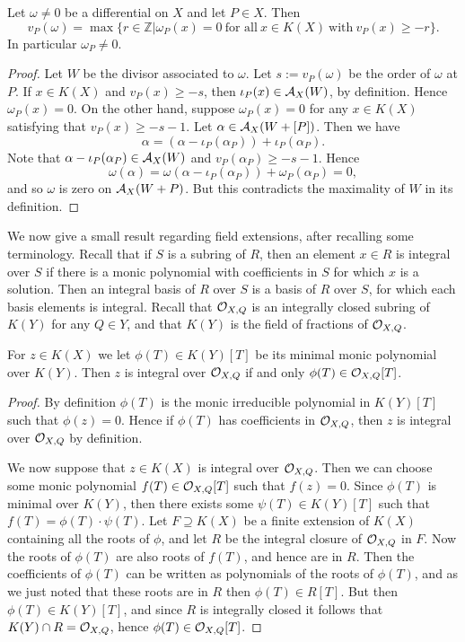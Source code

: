 \begin{prop}\label{propertyofomega}
 Let $\omega \neq 0$ be a differential on $X$ and let $P\in X$. Then
 \[
  v_P(\omega) = \max \{r\in \mathbb{Z}|\omega_P(x) = 0\ \text{for all} \ x\in K(X) \ \text{with}\ v_P(x) \geq -r\}.
 \]
In particular $\omega_P \neq 0$.
\end{prop}
\begin{proof}
 Let $W$ be the divisor associated to $\omega$.
 Let $s:=v_P(\omega)$ be the order of $\omega$ at $P$.
 If $x\in K(X)$ and $v_P(x)\geq -s$, then $\iota_P(x) \in {\mathcal A}_X(W)$, by definition.
 Hence $\omega_P(x) = 0$.
 On the other hand, suppose $\omega_P(x) = 0$ for any $x\in K(X)$ satisfying that $v_P(x) \geq -s-1$.
 Let $\alpha\in {\mathcal A}_X(W+[P])$.
 Then we have
 \[
  \alpha = (\alpha-\iota_P(\alpha_P)) + \iota_P(\alpha_P).
 \]
Note that $\alpha - \iota_P(\alpha_P)\in {\mathcal A}_X(W)$ and $v_P(\alpha_P) \geq -s-1$.
Hence
\[
 \omega(\alpha) = \omega(\alpha-\iota_P(\alpha_P))  + \omega_P(\alpha_P) = 0,
\]
and so $\omega$ is zero on ${\mathcal A}_X(W+P)$.
But this contradicts the maximality of $W$ in its definition.
 
\end{proof}



We now give a small result regarding field extensions, after recalling some terminology.
Recall that if $S$ is a subring of $R$, then an element $x\in R$ is integral over $S$ if there is a monic polynomial with coefficients in $S$ for which $x$ is a solution.
Then an integral basis of $R$ over $S$ is a basis of $R$ over $S$, for which each basis elements is integral.
 Recall that ${\cal O}_{X,Q}$ is an integrally closed subring of $K(Y)$ for any $Q\in Y$, and that $K(Y)$ is the field of fractions of ${\cal O}_{X,Q}$.


\begin{prop}
 For $z\in K(X)$ we let $\phi(T)\in K(Y)[T]$ be its minimal monic polynomial over $K(Y)$.
 Then $z$ is integral over ${\cal O}_{X,Q}$ if and only $\phi (T)\in {\cal O}_{X,Q}[T]$.
\end{prop}
\begin{proof}
 By definition $\phi(T)$ is the monic irreducible polynomial in $K(Y)[T]$ such that $\phi(z) = 0$. 
 Hence if $\phi (T)$ has coefficients in ${\cal O}_{X,Q}$, then $z$ is integral over ${\cal O}_{X,Q}$ by definition.
 
 We now suppose that $z\in K(X)$ is integral over ${\cal O}_{X,Q}$.
 Then we can choose some monic polynomial $f(T)\in {\cal O}_{X,Q}[T]$ such that $f(z) = 0$.
 Since $\phi(T)$ is minimal over $K(Y)$, then there exists some $\psi(T)\in K(Y)[T]$ such that $f(T) = \phi(T)\cdot \psi(T)$.
 Let $F \supseteq K(X)$ be a finite extension of $K(X)$ containing all the roots of $\phi$, and let $R$ be the integral closure of ${\cal O}_{X,Q}$ in $F$.
 Now the roots of $\phi(T)$ are also roots of $f(T)$, and hence are in $R$.
 Then the coefficients of $\phi(T)$ can be written as polynomials of the roots of $\phi(T)$, and as we just noted that these roots are in $R$ then $\phi(T) \in R[T]$.
 But then $\phi(T)\in K(Y)[T]$, and since $R$ is integrally closed it follows that $K(Y)\cap R = {\cal O}_{X,Q}$, hence $\phi(T)\in {\cal O}_{X,Q}[T]$.
\end{proof}

